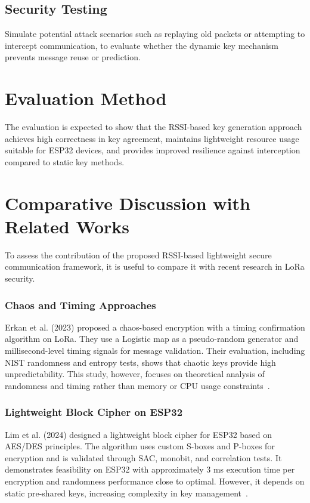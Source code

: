 \subsection{Security Testing}
Simulate potential attack scenarios such as replaying old packets or attempting to intercept communication, to evaluate whether the dynamic key mechanism prevents message reuse or prediction.

 \section{Evaluation Method}
 The evaluation is expected to show that the RSSI-based key generation approach achieves high correctness in key agreement, maintains lightweight resource usage suitable for ESP32 devices, and provides improved resilience against interception compared to static key methods.

\section{Comparative Discussion with Related Works}

To assess the contribution of the proposed RSSI-based lightweight secure communication framework, it is useful to compare it with recent research in LoRa security.

\subsubsection{Chaos and Timing Approaches}
Erkan et al. (2023) proposed a chaos-based encryption with a timing confirmation algorithm on LoRa. They use a Logistic map as a pseudo-random generator and millisecond-level timing signals for message validation. Their evaluation, including NIST randomness and entropy tests, shows that chaotic keys provide high unpredictability. This study, however, focuses on theoretical analysis of randomness and timing rather than memory or CPU usage constraints~\cite{erkan2023}.

\subsubsection{Lightweight Block Cipher on ESP32}
Lim et al. (2024) designed a lightweight block cipher for ESP32 based on AES/DES principles. The algorithm uses custom S-boxes and P-boxes for encryption and is validated through SAC, monobit, and correlation tests. It demonstrates feasibility on ESP32 with approximately 3 ms execution time per encryption and randomness performance close to optimal. However, it depends on static pre-shared keys, increasing complexity in key management~\cite{lim2024}.

